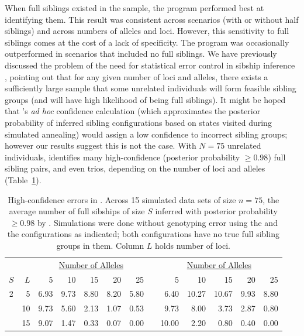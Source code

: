 \documentclass[11pt]{article}
\begin{document}
{When full siblings existed in the sample, the program \colony{} performed best at identifying them.  
This result was consistent across scenarios (with or without half siblings) and across numbers of 
alleles and loci.  However, this sensitivity to full siblings comes at the cost of a lack of 
specificity.  The program \colony{} was occasionally outperformed in scenarios that included no full 
siblings.  We have previously discussed the problem of the need for statistical error control in 
sibship inference \citep{alm&and11}, pointing out that for any given number of loci and alleles, there 
exists a sufficiently large sample that some unrelated individuals will form feasible sibling groups 
(and will have high likelihood of being full siblings).  It might be hoped that \colony{}'s {\em ad 
hoc} confidence calculation (which approximates the posterior probability of inferred sibling 
configurations based on states visited during simulated annealing) would assign a low confidence to 
incorrect sibling groups; however our results suggest this is not the case. With $N=75$ unrelated 
individuals, \colony{} identifies many high-confidence (posterior probability $\geq 0.98$) full sibling 
pairs, and even trios, depending on the number of loci and alleles (Table~\ref{tab:hiconf}).
\begin{table}
\caption{High-confidence errors in \colony{}. Across 15 simulated data sets of size $n=75$,
the average number of full sibships of size $S$ inferred with posterior probability $\geq 0.98$ by
\colony{}. Simulations were done without genotyping error using the \nosibs{} and the
\allhalf{} configurations as indicated; both configurations have no true full sibling groups in
them.  Column $L$ holds number of loci.  \label{tab:hiconf}  } 
\begin{center}
\begin{tabular}{crrrrrrrrrrrr}
                &      & \multicolumn{5}{c}{\underline{Number of Alleles}}      &    & \multicolumn{5}{c}{\underline{Number of Alleles}}       \\
	$S$			& $L$  &   5    &    10  &    15  &    20  &    25  &    &      5  &  10     &    15   &    20  &   25 \\ \hline
	2			&   5  &  6.93  &  9.73  &  8.80  &  8.20  &  5.80  &    &   6.40  &  10.27  &  10.67  &  9.93  &  8.80\\
				&  10  &  9.73  &  5.60  &  2.13  &  1.07  &  0.53  &    &   9.73  &   8.00  &   3.73  &  2.87  &  0.80\\
				&  15  &  9.07  &  1.47  &  0.33  &  0.07  &  0.00  &    &  10.00  &   2.20  &   0.80  &  0.40  &  0.00\\

\end{tabular}
\end{center}
\end{table}}
\end{document}
